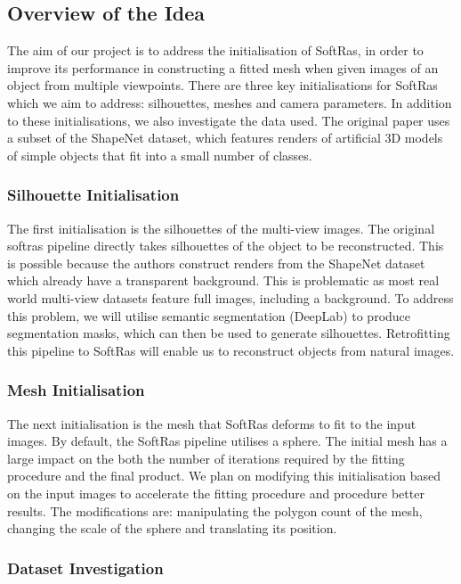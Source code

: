 \documentclass{article}
\begin{document}
\subsection{Overview of the Idea}

The aim of our project is to address the initialisation of SoftRas, in order to improve its performance in constructing a fitted mesh when given images of an object from multiple viewpoints. There are three key initialisations for SoftRas which we aim to address: silhouettes, meshes and camera parameters. In addition to these initialisations, we also investigate the data used. The original paper uses a subset of the ShapeNet \parencite{shapenet} dataset, which features renders of artificial 3D models of simple objects that fit into a small number of classes.

\subsubsection{Silhouette Initialisation}

The first initialisation is the silhouettes of the multi-view images. The original softras pipeline directly takes silhouettes of the object to be reconstructed. This is possible because the authors construct renders from the ShapeNet dataset which already have a transparent background. This is problematic as most real world multi-view datasets feature full images, including a background. To address this problem, we will utilise semantic segmentation (DeepLab) to produce segmentation masks, which can then be used to generate silhouettes. Retrofitting this pipeline to SoftRas will enable us to reconstruct objects from natural images.

\subsubsection{Mesh Initialisation}

The next initialisation is the mesh that SoftRas deforms to fit to the input images. By default, the SoftRas pipeline utilises a sphere. The initial mesh has a large impact on the both the number of iterations required by the fitting procedure and the final product. We plan on modifying this initialisation based on the input images to accelerate the fitting procedure and procedure better results. The modifications are: manipulating the polygon count of the mesh, changing the scale of the sphere and translating its position.

\subsubsection{Dataset Investigation}
\end{document}
